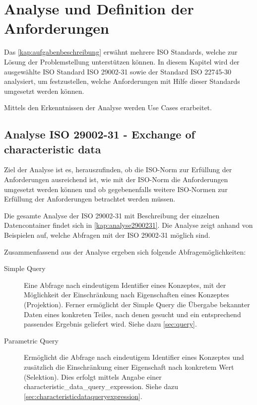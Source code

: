 \chapter{Analyse und Definition der Anforderungen } \label{kap:analyse_und_definition}

Das \autoref{kap:aufgabenbeschreibung} erwähnt mehrere ISO Standards, welche zur Lösung der Problemstellung unterstützen können. In diesem Kapitel wird der ausgewählte ISO Standard ISO 29002-31 sowie der Standard ISO 22745-30 analysiert, um festzustellen, welche Anforderungen mit Hilfe dieser Standards umgesetzt werden können. 

Mittels den Erkenntnissen der Analyse werden Use Cases erarbeitet. 

\section{Analyse ISO 29002-31 - Exchange of characteristic data}\label{kap:analyseiso2900231}

Ziel der Analyse ist es, herauszufinden, ob die ISO-Norm zur Erfüllung der Anforderungen ausreichend ist, wie mit der ISO-Norm die Anforderungen umgesetzt werden können und ob gegebenenfalls weitere ISO-Normen zur Erfüllung der Anforderungen betrachtet werden müssen. 

Die gesamte Analyse der ISO 29002-31 mit Beschreibung der einzelnen Datencontainer findet sich in \autoref{kap:analyse2900231}. Die Analyse zeigt anhand von Beispielen auf, welche Abfragen mit der ISO 29002-31 möglich sind.

Zusammenfassend aus der Analyse ergeben sich folgende Abfragemöglichkeiten:
\begin{description}
\item[Simple Query] Eine Abfrage nach eindeutigem Identifier eines Konzeptes, mit der Möglichkeit der Einschränkung nach Eigenschaften eines Konzeptes (Projektion). Ferner ermöglicht der Simple Query die Übergabe bekannter Daten eines konkreten Teiles, nach denen gesucht und ein entsprechend passendes Ergebnis geliefert wird. Siehe dazu \autoref{sec:query}.
\item[Parametric Query] Ermöglicht die Abfrage nach eindeutigem Identifier eines Konzeptes und zusätzlich die Einschränkung einer Eigenschaft nach konkretem Wert (Selektion). Dies erfolgt mittels Angabe einer characteristic\_data\_query\_expression. Siehe dazu \autoref{sec:characteristicdataqueryexpression}.
\end{description}


